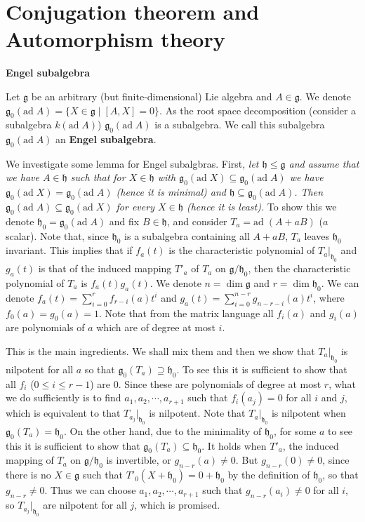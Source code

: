 \documentclass{article}
\newcommand{\SBar}{\;|\;}
\newcommand{\lie}[1]{\mathfrak{#1}}
\newcommand{\ad}[1]{\mathrm{ad}\; #1}
\begin{document}
\newpage

\part{Conjugation theorem and Automorphism theory}

\newpage

\textbf{Engel subalgebra}

Let $\lie{g}$ be an arbitrary (but finite-dimensional) Lie algebra and $A \in \lie{g}$.
We denote $\lie{g}_0(\ad{A}) = \{X \in \lie{g} \SBar [A, X] = 0\}$.
As the root space decomposition (consider a subalgebra $k(\ad{A})$) $\lie{g}_0(\ad{A})$ is a subalgebra.
We call this subalgebra $\lie{g}_0(\ad{A})$ an \textbf{Engel subalgebra}.

We investigate some lemma for Engel subalgbras.
First, \textit{let $\lie{h} \le \lie{g}$ and assume that we have $A \in \lie{h}$ such that for $X \in \lie{h}$ with $\lie{g}_0(\ad{X}) \subseteq \lie{g}_0(\ad{A})$ we have $\lie{g}_0(\ad{X}) = \lie{g}_0(\ad{A})$ (hence it is minimal) and $\lie{h} \subseteq \lie{g}_0(\ad{A})$.
Then $\lie{g}_0(\ad{A}) \subseteq \lie{g}_0(\ad{X})$ for every $X \in \lie{h}$ (hence it is least).}
To show this we denote $\lie{h}_0 = \lie{g}_0(\ad{A})$ and fix $B \in \lie{h}$, and consider $T_a = \ad{(A + aB)}$ ($a$ scalar).
Note that, since $\lie{h}_0$ is a subalgebra containing all $A + aB$, $T_a$ leaves $\lie{h}_0$ invariant.
This implies that if $f_a(t)$ is the characteristic polynomial of $T_a|_{\lie{h}_0}$ and $g_a(t)$ is that of the induced mapping $T'_a$ of $T_a$ on $\lie{g}/\lie{h}_0$, then the characteristic polynomial of $T_a$ is $f_a(t) g_a(t)$.
We denote $n = \dim{\lie{g}}$ and $r = \dim{\lie{h}}_0$.
We can denote $f_a(t) = \sum_{i = 0}^r f_{r - i}(a) t^i$ and $g_a(t) = \sum_{i = 0}^{n - r} g_{n - r - i}(a) t^i$, where $f_0(a) = g_0(a) = 1$.
Note that from the matrix language all $f_i(a)$ and $g_i(a)$ are polynomials of $a$ which are of degree at most $i$.

This is the main ingredients.
We shall mix them and then we show that $T_a|_{\lie{h}_0}$ is nilpotent for all $a$ so that $\lie{g}_0(T_a) \supseteq \lie{h}_0$.
To see this it is sufficient to show that all $f_i$ ($0 \le i \le r - 1$) are 0.
Since these are polynomials of degree at most $r$, what we do sufficiently is to find $a_1, a_2, \cdots, a_{r + 1}$ such that $f_i(a_j) = 0$ for all $i$ and $j$, which is equivalent to that $T_{a_j}|_{\lie{h}_0}$ is nilpotent.
Note that $T_a|_{\lie{h}_0}$ is nilpotent when $\lie{g}_0(T_a) = \lie{h}_0$.
On the other hand, due to the minimality of $\lie{h}_0$, for some $a$ to see this it is sufficient to show that $\lie{g}_0(T_a) \subseteq \lie{h}_0$.
It holds when $T'_a$, the induced mapping of $T_a$ on $\lie{g}/\lie{h}_0$ is invertible, or $g_{n - r}(a) \ne 0$.
But $g_{n - r}(0) \ne 0$, since there is no $X \in \lie{g}$ such that $T'_0(X + \lie{h}_0) = 0 + \lie{h}_0$ by the definition of $\lie{h}_0$, so that $g_{n - r} \ne 0$.
Thus we can choose $a_1, a_2, \cdots, a_{r + 1}$ such that $g_{n - r}(a_i) \ne 0$ for all $i$, so $T_{a_j}|_{\lie{h}_0}$ are nilpotent for all $j$, which is promised.
\end{document}
